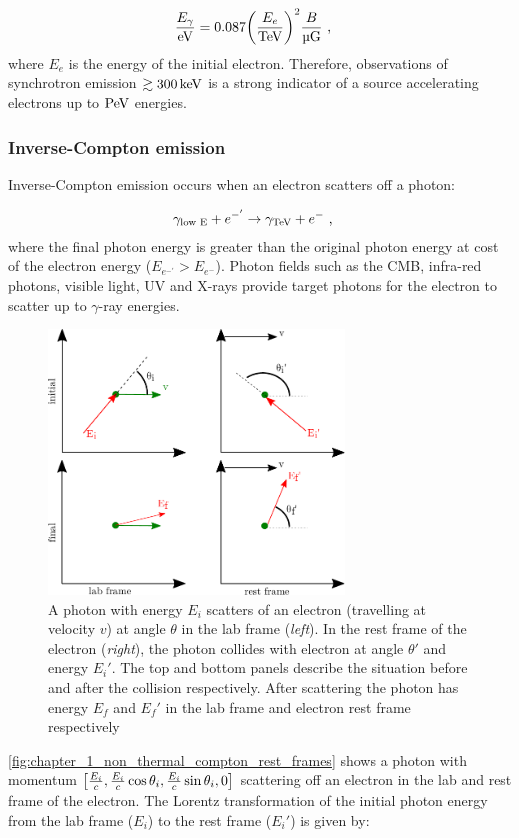 \begin{equation}
    \begin{aligned}
    \frac{E_\gamma}{\eV}&=0.087 \qty(\frac{E_e}{\TeV})^2 \frac{B}{\si{\micro G}}\text{ ,}
    \end{aligned}
\end{equation}
\noindent where $E_e$ is the energy of the initial electron. Therefore, observations of synchrotron emission $\gtrsim 300\,\si{\kilo\electronvolt}$ is a strong indicator of a source accelerating electrons up to $\PeV$ energies.

\subsubsection{Inverse-Compton emission}

Inverse-Compton emission occurs when an electron scatters off a photon:

\begin{align}
	\gamma_\text{low E} + e^{-'}&\rightarrow \gamma_{\TeV}+e^{-}\text{ ,}
\end{align}
where the final photon energy is greater than the original photon energy at cost of the electron energy ($E_{e^{-'}}>E_{e^-}$). Photon fields such as the CMB, infra-red photons, visible light, UV and X-rays provide target photons for the electron to scatter up to $\gamma$-ray energies. 
\newpar
\begin{figure}[h!]
	\centering
	\includegraphics[width=0.7\textwidth]{04_Introduction/Images/non_thermal_emission/inverse_compton.pdf}
	\caption{A photon with energy $E_i$ scatters of an electron (travelling at velocity $v$) at angle $\theta$ in the lab frame (\textit{left}). In the rest frame of the electron (\textit{right}), the photon collides with electron at angle $\theta'$ and energy $E_i'$. The top and bottom panels describe the situation before and after the collision respectively. After scattering the photon has energy $E_f$ and $E_f'$ in the lab frame and electron rest frame respectively}
	\label{fig:chapter_1_non_thermal_compton_rest_frames}
\end{figure}
\autoref{fig:chapter_1_non_thermal_compton_rest_frames} shows a photon with momentum $\qty[\frac{E_i}{c},\frac{E_i}{c}\cos\theta_i,\frac{E_i}{c}\sin\theta_i,0]$ scattering off an electron in the lab and rest frame of the electron. The Lorentz transformation of the initial photon energy from the lab frame ($E_i$) to the rest frame ($E_i'$) is given by:


